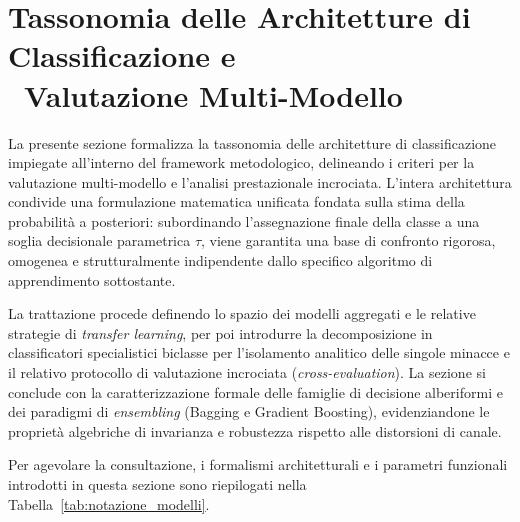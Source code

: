 \section[Tassonomia delle Architetture di Classificazione e Valutazione Multi-Modello]{Tassonomia delle Architetture di Classificazione e \\\ Valutazione Multi-Modello}
\label{sec:tassonomia_modelli}

La presente sezione formalizza la tassonomia delle architetture di classificazione impiegate all'interno del framework metodologico, delineando i criteri per la valutazione multi-modello e l'analisi prestazionale incrociata. 
L'intera architettura condivide una formulazione matematica unificata fondata sulla stima della probabilità a posteriori: subordinando l'assegnazione finale della classe a una soglia decisionale parametrica $\tau$, viene garantita una base di confronto rigorosa, omogenea e strutturalmente indipendente dallo specifico algoritmo di apprendimento sottostante. 

La trattazione procede definendo lo spazio dei modelli aggregati e le relative strategie di \textit{transfer learning}, per poi introdurre la decomposizione in classificatori specialistici biclasse per l'isolamento analitico delle singole minacce e il relativo protocollo di valutazione incrociata (\textit{cross-evaluation}). La sezione si conclude con la caratterizzazione formale delle famiglie di decisione alberiformi e dei paradigmi di \textit{ensembling} (Bagging e Gradient Boosting), evidenziandone le proprietà algebriche di invarianza e robustezza rispetto alle distorsioni di canale.

Per agevolare la consultazione, i formalismi architetturali e i parametri funzionali introdotti in questa sezione sono riepilogati nella Tabella~\ref{tab:notazione_modelli}.

